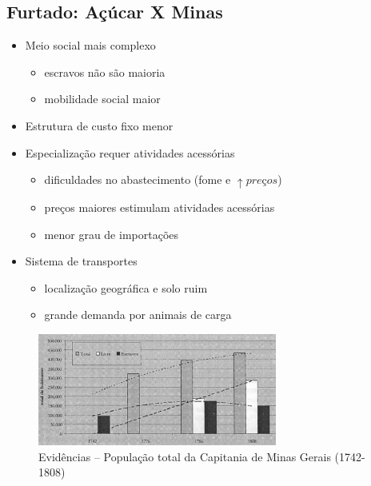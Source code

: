 \documentclass[a4paper,12pt]{article}[abntex2]
\begin{document}
\subsection{\textbf{Furtado: Açúcar X Minas}}
\begin{itemize}
    \item Meio social mais complexo \begin{itemize}
        \item escravos não são maioria
        \item mobilidade social maior
    \end{itemize}
    \item Estrutura de custo fixo menor
    \item Especialização requer atividades acessórias \begin{itemize}
        \item dificuldades no abastecimento (fome e $\uparrow{preços}$)
        \item preços maiores estimulam atividades acessórias
        \item menor grau de importações
    \end{itemize}
    \item Sistema de transportes \begin{itemize}
        \item localização geográfica e solo ruim
        \item grande demanda por animais de carga
    \end{itemize}
\end{itemize}

\begin{figure}[H]
    \centering
    \includegraphics[width=0.7\textwidth]{Imagens Slides/i1a3.png}
    \caption{Evidências – População total da Capitania de Minas Gerais (1742-1808)}
\end{figure}
\end{document}

